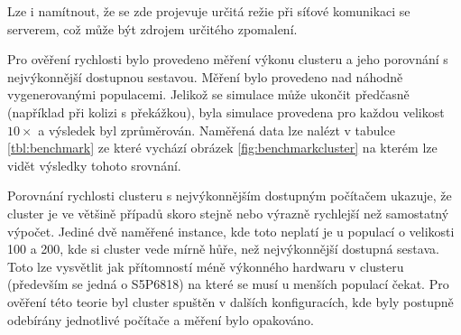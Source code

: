 Lze i namítnout, že se zde projevuje určitá režie při síťové komunikaci se serverem, což může být zdrojem určitého zpomalení.

Pro ověření rychlosti bylo provedeno měření výkonu clusteru a jeho porovnání s nejvýkonnější dostupnou sestavou. Měření bylo provedeno nad náhodně vygenerovanými populacemi. Jelikož se simulace může ukončit předčasně (například při kolizi s překážkou), byla simulace provedena pro každou velikost $10\times$ a výsledek byl zprůměrován. Naměřená data lze nalézt v tabulce \ref{tbl:benchmark} ze které vychází obrázek \ref{fig:benchmarkcluster} na kterém lze vidět výsledky tohoto srovnání. 

Porovnání rychlosti clusteru s nejvýkonnějším dostupným počítačem ukazuje, že cluster je ve většině případů skoro stejně nebo  výrazně rychlejší než samostatný výpočet. Jediné dvě naměřené instance, kde toto neplatí je u populací o velikosti 100 a 200, kde si cluster vede mírně hůře, než nejvýkonnější dostupná sestava. 
Toto lze vysvětlit jak přítomností méně výkonného hardwaru v clusteru (především se jedná o S5P6818) na které se musí u menších populací čekat. Pro ověření této teorie byl cluster spuštěn v dalších konfiguracích, kde byly postupně odebírány jednotlivé počítače a měření bylo opakováno. 

